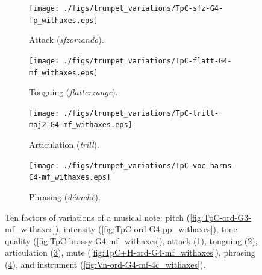\begin{figure}
        \begin{subfigure}{0.25\textwidth}
                \centering
                \texttt{[image: ./figs/trumpet\_variations/TpC-sfz-G4-fp\_withaxes.eps]}
                \caption{Attack (\emph{sfzorzando}).}
                \label{fig:TpC-sfz-G4-fp_withaxes}
        \end{subfigure}%
        \begin{subfigure}{0.25\textwidth}
                \centering
                \texttt{[image: ./figs/trumpet\_variations/TpC-flatt-G4-mf\_withaxes.eps]}
                \caption{Tonguing (\emph{flatterzunge}).}
                \label{fig:TpC-flatt-G4-mf_withaxes}
        \end{subfigure}

        \begin{subfigure}{0.25\textwidth}
                \centering
                \texttt{[image: ./figs/trumpet\_variations/TpC-trill-maj2-G4-mf\_withaxes.eps]}
                \caption{Articulation (\emph{trill}).}
                \label{fig:TpC-trill-maj2-G4-mf_withaxes}
        \end{subfigure}%
        \begin{subfigure}{0.25\textwidth}
                \centering
                \texttt{[image: ./figs/trumpet\_variations/TpC-voc-harms-C4-mf\_withaxes.eps]}
                \caption{Phrasing (\emph{d\'{e}tach\'{e}}).}
                \label{fig:TpC+voc-harms-G4-mf_withaxes}
        \end{subfigure}%
        \caption{Ten factors of variations of a musical note: pitch (\ref{fig:TpC-ord-G3-mf_withaxes}), intensity (\ref{fig:TpC-ord-G4-pp_withaxes}), tone quality (\ref{fig:TpC-brassy-G4-mf_withaxes}), attack (\ref{fig:TpC-sfz-G4-fp_withaxes}), tonguing (\ref{fig:TpC-flatt-G4-mf_withaxes}), articulation (\ref{fig:TpC-trill-maj2-G4-mf_withaxes}), mute (\ref{fig:TpC+H-ord-G4-mf_withaxes}), phrasing (\ref{fig:TpC+voc-harms-G4-mf_withaxes}), and instrument (\ref{fig:Vn-ord-G4-mf-4c_withaxes}).}\label{fig:trumpet-variations}
\end{figure}


